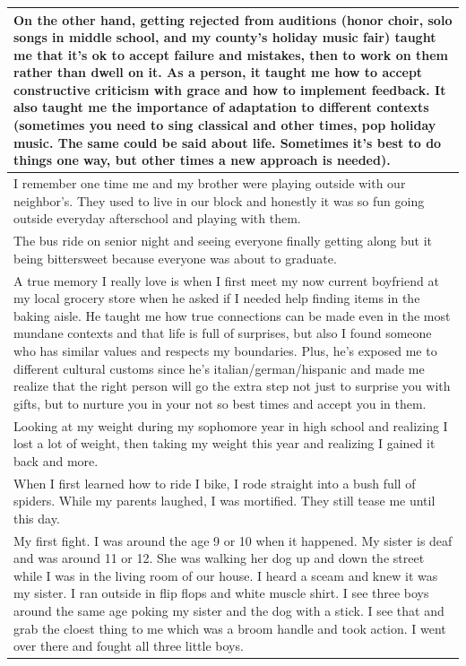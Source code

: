 \documentclass[
  .7em,
  letterpaper,
  DIV=11,
  numbers=noendperiod]{scrartcl}
\begin{document}
\begin{table}
\begin{tabular}{l}
\hline
On the other hand, getting rejected from auditions (honor choir, solo songs in middle school, and my county's holiday music fair) taught me that it's ok to accept failure and mistakes, then to work on them rather than dwell on it. As a person, it taught me how to accept constructive criticism with grace and how to implement feedback. It also taught me the importance of adaptation to different contexts (sometimes you need to sing classical and other times, pop holiday music. The same could be said about life. Sometimes it's best to do things one way, but other times a new approach is needed).\\
\hline
I remember one time me and my brother were playing outside with our neighbor's. They used to live in our block and honestly it was so fun going outside everyday afterschool and playing with them.\\
\hline
The bus ride on senior night and seeing everyone finally getting along but it being bittersweet because everyone was about to graduate.\\
\hline
A true memory I really love is when I first meet my now current boyfriend at my local grocery store when he asked if I needed help finding items in the baking aisle. He taught me how true connections can be made even in the most mundane contexts and that life is full of surprises, but also I found someone who has similar values and respects my boundaries. Plus, he's exposed me to different cultural customs since he's italian/german/hispanic and made me realize that the right person will go the extra step not just to surprise you with gifts, but to nurture you in your not so best times and accept you in them.\\
\hline
Looking at my weight during my sophomore year in high school and realizing I lost a lot of weight, then taking my weight this year and realizing I gained it back and more.\\
\hline
When I first learned how to ride I bike, I rode straight into a bush full of spiders. While my parents laughed, I was mortified. They still tease me until this day.\\
\hline
My first fight. I was around the age 9 or 10 when it happened. My sister is deaf and was around 11 or 12. She was walking her dog up and down the street while I was in the living room of our house. I heard a sceam and knew it was my sister. I ran outside in flip flops and white muscle shirt. I see three boys around the same age poking my sister and the dog with a stick. I see that and grab the cloest thing to me which was a broom handle and took action. I went over there and fought all three little boys.\\

\end{tabular}
\end{table}
\end{document}
